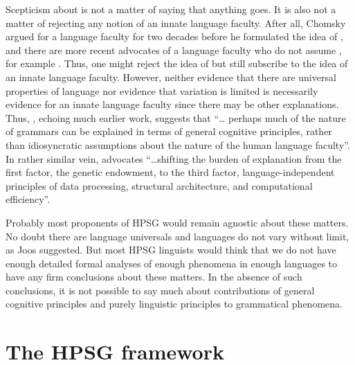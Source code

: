 \documentclass[output=paper]{langsci/langscibook}
\begin{document}
Scepticism about  is not a matter of saying that anything goes.  It
is also not a matter of rejecting any notion of an innate language faculty.
After all, Chomsky argued for a language faculty for two decades before he
formulated the idea of , and there are more recent advocates of a
language faculty who do not assume , for example \citet{CulJac2005}.
Thus, one might reject the idea of  but still subscribe to the idea
of an innate language faculty.  However, neither evidence that there are
universal properties of language nor evidence that variation is limited is
necessarily evidence for an innate language faculty since there may be other
explanations. Thus, \citet[478]{Sag1997}, echoing much earlier work, suggests
that \enquote{\dots{} perhaps much of the nature of grammars can be explained
    in terms of general cognitive principles, rather than idiosyncratic
    assumptions about the nature of the human language faculty}. In rather
    similar vein, \citet[9]{Chomsky2005} advocates \enquote{\dots shifting the
        burden of explanation from the first factor, the genetic endowment, to
        the third factor, language-independent principles of data processing,
    structural architecture, and computational efficiency}.

Probably most proponents of \gls{HPSG} would remain agnostic about these matters. No
doubt there are language universals and languages do not vary without limit, as
Joos suggested. But most \gls{HPSG} linguists would think that we do not have enough
detailed formal analyses of enough phenomena in enough languages to have any
firm conclusions about these matters. In the absence of such conclusions, it is
not possible to say much about contributions of general cognitive principles
and purely linguistic principles to grammatical phenomena.

\section{The HPSG framework}\label{sec-5:3}
\end{document}
